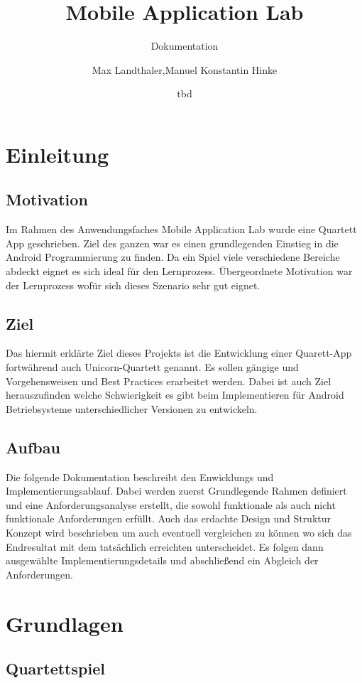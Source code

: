 \documentclass{scrartcl}
\title{Mobile Application Lab}
\subtitle{Dokumentation}
\date{tbd}
\author{Max Landthaler,Manuel Konstantin Hinke}
\begin{document}
\maketitle

\section{Einleitung}
\subsection{Motivation}


Im Rahmen des Anwendungsfaches Mobile Application Lab wurde eine Quartett App geschrieben. Ziel des ganzen war es einen grundlegenden Einstieg in die Android Programmierung zu finden. Da ein Spiel viele verschiedene Bereiche abdeckt eignet es sich ideal für den Lernprozess.
Übergeordnete Motivation war der Lernprozess wofür sich dieses Szenario sehr gut eignet.

\subsection{Ziel}

Das hiermit erklärte Ziel dieses Projekts ist die Entwicklung einer Quarett-App fortwährend auch Unicorn-Quartett genannt. Es sollen gängige und Vorgehensweisen und Best Practices erarbeitet werden.
Dabei ist auch Ziel herauszufinden welche Schwierigkeit es gibt beim Implementieren für Android Betriebsysteme unterschiedlicher Versionen zu entwickeln.


\subsection{Aufbau}

Die folgende Dokumentation beschreibt den Enwicklungs und Implementierungsablauf.
Dabei werden zuerst Grundlegende Rahmen definiert und eine Anforderungsanalyse erstellt, die sowohl funktionale als auch nicht funktionale Anforderungen erfüllt.
Auch das erdachte Design und Struktur Konzept wird beschrieben um auch eventuell vergleichen zu können wo sich das Endresultat mit dem tatsächlich erreichten unterscheidet.
Es folgen dann ausgewählte Implementierungsdetails und abschließend ein Abgleich der Anforderungen.

\section{Grundlagen}
\subsection{Quartettspiel}
\end{document}
